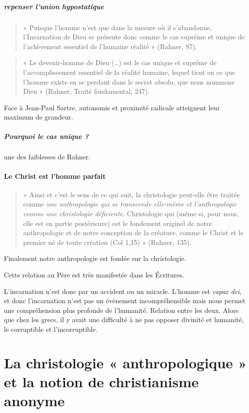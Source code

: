 \subparagraph{repenser l'union hypostatique}
\begin{quote}
    « Puisque l’homme n’est que dans la mesure où il s’abandonne, l’Incarnation de Dieu se présente donc comme le cas suprême et unique de l’achèvement essentiel de l’humaine réalité » (Rahner, 87).  
\end{quote}

\begin{quote}
    « Le devenir-homme de Dieu (…) est le cas unique et suprême de l’accomplissement essentiel de la réalité humaine, lequel tient en ce que l’homme existe en se perdant dans le secret absolu, que nous nommons Dieu » (Rahner, Traité fondamental, 247).  
\end{quote}
Face à Jean-Paul Sartre, autonomie et proximité radicale atteignent leur maximum de grandeur.

\subparagraph{Pourquoi le cas unique ?} une des faiblesses de Rahner.



\paragraph{Le Christ est l’homme parfait }

\begin{quote}
    « Ainsi et c’est le sens de ce qui suit, la christologie peut-elle être traitée comme \textit{une anthropologie qui se transcende elle-même et l’anthropologie comme une christologie déficiente}. Christologie qui (même si, pour nous, elle est en partie postérieure) est le fondement originel de notre anthropologie et de notre conception de la créature, comme le Christ et le premier né de toute création (Col 1,15) » (Rahner, 135).  
\end{quote}
Finalement notre anthropologie est fondée sur la christologie.

Cette relation au Père est très manifestée dans les Écritures. 

L'incarnation n'est donc par un accident ou un miracle. L'homme est \textit{capax dei}, et donc l'incarnation n'est pas un évènement incompréhensible mais nous permet une compréhension plus profonde de l'humanité. Relation entre les deux. Alors que chez les grecs, il y avait une difficulté à ne pas opposer divinité et humanité, le corruptible et l'incorruptible.


\section{La christologie « anthropologique » et la notion de christianisme anonyme} 

